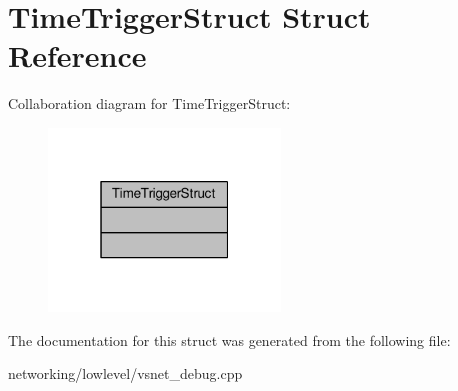 \hypertarget{structTimeTriggerStruct}{}\section{Time\+Trigger\+Struct Struct Reference}
\label{structTimeTriggerStruct}


Collaboration diagram for Time\+Trigger\+Struct\+:
\nopagebreak
\begin{figure}[H]
\begin{center}
\leavevmode
\includegraphics[width=175pt]{df/d22/structTimeTriggerStruct__coll__graph}
\end{center}
\end{figure}


The documentation for this struct was generated from the following file\+:\begin{DoxyCompactItemize}
\item 
networking/lowlevel/vsnet\+\_\+debug.\+cpp\end{DoxyCompactItemize}
